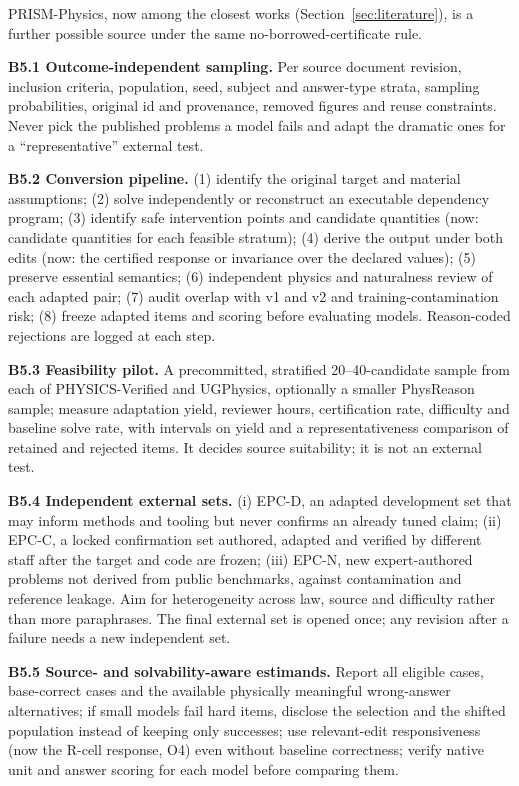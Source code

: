 \documentclass[10pt,a4paper]{article}
\begin{document}
PRISM-Physics, now among the closest works (Section~\ref{sec:literature}), is a further possible source under the
same no-borrowed-certificate rule.

\textbf{B5.1 Outcome-independent sampling.} Per source document revision, inclusion criteria, population, seed,
subject and answer-type strata, sampling probabilities, original id and provenance, removed figures and reuse
constraints. Never pick the published problems a model fails and adapt the dramatic ones for a
``representative'' external test.

\textbf{B5.2 Conversion pipeline.} (1) identify the original target and material assumptions; (2) solve
independently or reconstruct an executable dependency program; (3) identify safe intervention points and
candidate quantities (now: candidate quantities for each feasible stratum); (4) derive the output under both edits
(now: the certified response or invariance over the declared values); (5) preserve essential semantics;
(6) independent physics and naturalness review of each adapted pair; (7) audit overlap with v1 and v2 and
training-contamination risk; (8) freeze adapted items and scoring before evaluating models. Reason-coded
rejections are logged at each step.

\textbf{B5.3 Feasibility pilot.} A precommitted, stratified 20--40-candidate sample from each of
PHYSICS-Verified and UGPhysics, optionally a smaller PhysReason sample; measure adaptation yield, reviewer hours,
certification rate, difficulty and baseline solve rate, with intervals on yield and a representativeness
comparison of retained and rejected items. It decides source suitability; it is not an external test.

\textbf{B5.4 Independent external sets.} (i) EPC-D, an adapted development set that may inform methods and
tooling but never confirms an already tuned claim; (ii) EPC-C, a locked confirmation set authored, adapted and
verified by different staff after the target and code are frozen; (iii) EPC-N, new expert-authored problems not
derived from public benchmarks, against contamination and reference leakage. Aim for heterogeneity across law,
source and difficulty rather than more paraphrases. The final external set is opened once; any revision after a
failure needs a new independent set.

\textbf{B5.5 Source- and solvability-aware estimands.} Report all eligible cases, base-correct cases and the
available physically meaningful wrong-answer alternatives; if small models fail hard items, disclose the selection
and the shifted population instead of keeping only successes; use relevant-edit responsiveness (now the R-cell
response, O4) even without baseline correctness; verify native unit and answer scoring for each model before
comparing them.
\end{document}
